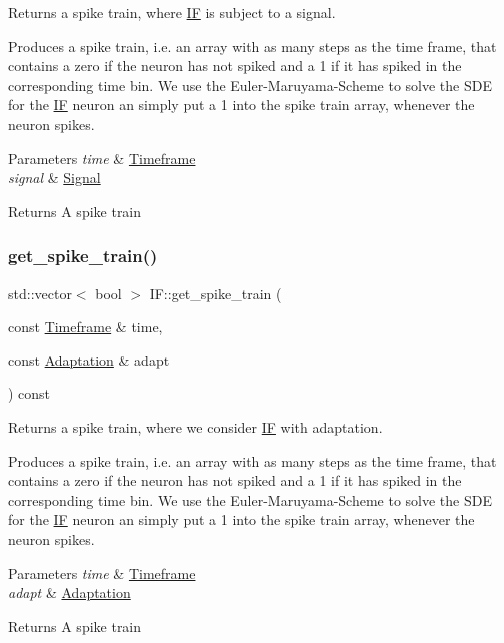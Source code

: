 Returns a spike train, where \hyperlink{classIF}{IF} is subject to a signal. 

Produces a spike train, i.\+e. an array with as many steps as the time frame, that contains a zero if the neuron has not spiked and a 1 if it has spiked in the corresponding time bin. We use the Euler-\/\+Maruyama-\/\+Scheme to solve the S\+DE for the \hyperlink{classIF}{IF} neuron an simply put a 1 into the spike train array, whenever the neuron spikes. 
\begin{DoxyParams}{Parameters}
{\em time} & \hyperlink{classTimeframe}{Timeframe} \\
\hline
{\em signal} & \hyperlink{classSignal}{Signal} \\
\hline
\end{DoxyParams}
\begin{DoxyReturn}{Returns}
A spike train 
\end{DoxyReturn}
\mbox{\label{classIF_a310fbd5d2bb172d8ac465d3e7398e5dc}} 
\subsubsection{\texorpdfstring{get\+\_\+spike\+\_\+train()}{get\_spike\_train()}\hspace{0.1cm}{\footnotesize\ttfamily [3/4]}}
{\footnotesize\ttfamily std\+::vector$<$ bool $>$ I\+F\+::get\+\_\+spike\+\_\+train (\begin{DoxyParamCaption}\item[{const \hyperlink{classTimeframe}{Timeframe} \&}]{time,  }\item[{const \hyperlink{classAdaptation}{Adaptation} \&}]{adapt }\end{DoxyParamCaption}) const}



Returns a spike train, where we consider \hyperlink{classIF}{IF} with adaptation. 

Produces a spike train, i.\+e. an array with as many steps as the time frame, that contains a zero if the neuron has not spiked and a 1 if it has spiked in the corresponding time bin. We use the Euler-\/\+Maruyama-\/\+Scheme to solve the S\+DE for the \hyperlink{classIF}{IF} neuron an simply put a 1 into the spike train array, whenever the neuron spikes. 
\begin{DoxyParams}{Parameters}
{\em time} & \hyperlink{classTimeframe}{Timeframe} \\
\hline
{\em adapt} & \hyperlink{classAdaptation}{Adaptation} \\
\hline
\end{DoxyParams}
\begin{DoxyReturn}{Returns}
A spike train 
\end{DoxyReturn}
\mbox{\label{classIF_aa8f7c58d753b9105cfd0def09ea90ab9}} 

